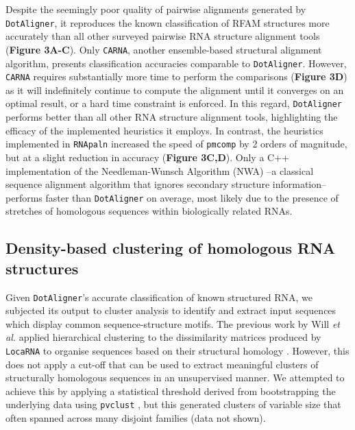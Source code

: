 \documentclass{bmcart}
\newcommand\dotaligner{\texttt{DotAligner}}
\newcommand\locarna{\texttt{LocaRNA}}
\newcommand\carna{\texttt{CARNA}}
\begin{document}
Despite the seemingly poor quality of pairwise alignments generated by \dotaligner{}, it 
reproduces the known classification of RFAM structures more accurately than all 
other surveyed pairwise RNA structure alignment tools (\textbf{Figure 3A-C}). Only \carna{}, 
another ensemble-based structural alignment algorithm, presents classification accuracies
comparable to \dotaligner{}. However, \carna{} requires substantially more time to perform 
the comparisons (\textbf{Figure 3D}) as it will indefinitely continue to compute the alignment
until it converges on an optimal result, or a hard time constraint is enforced.  In this regard, \dotaligner{} performs better than all other RNA structure alignment tools, highlighting 
the efficacy of the implemented heuristics it employs. In contrast, the heuristics implemented 
in \texttt{RNApaln} increased the speed of \texttt{pmcomp} by 2 orders of magnitude, but
at a slight reduction in accuracy (\textbf{Figure 3C,D}). Only a C++ implementation of the 
Needleman-Wunsch Algorithm (NWA) \cite{needleman1970general}--a classical 
sequence alignment algorithm that ignores secondary structure information--performs 
faster than \dotaligner{} on average, most likely due to the presence of stretches of 
homologous sequences within biologically related RNAs. \\

\subsection*{Density-based clustering of homologous RNA structures}

Given \dotaligner{}'s accurate classification of known structured RNA, we subjected its
output to cluster analysis to identify and extract input sequences which display common
sequence-structure motifs. The previous work by Will \textit{et al.} applied hierarchical clustering 
to the dissimilarity matrices produced by \locarna{} to organise sequences based on their
structural homology \cite{Will17432929}. However, this does not apply a cut-off that can be used 
to extract meaningful clusters of structurally homologous sequences in an unsupervised 
manner. We attempted to achieve this by applying a statistical threshold derived from 
bootstrapping the underlying data using \texttt{pvclust} \cite{suzuki2006pvclust}, but this
generated clusters of variable size that often spanned across many disjoint families 
(data not shown).\\
\end{document}
